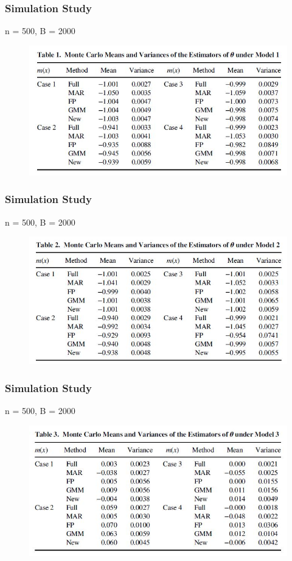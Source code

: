\documentclass{beamer}
\begin{document}
\begin{frame}
\frametitle{Simulation Study}
\centerline{n = 500, B = 2000}
\begin{figure}
\includegraphics[width=1\linewidth]{table1.jpg}
\end{figure}
\end{frame}
\begin{frame}
\frametitle{Simulation Study}
\centerline{n = 500, B = 2000}
\begin{figure}
\includegraphics[width=1\linewidth]{table2.jpg}
\end{figure}
\end{frame}
\begin{frame}
\frametitle{Simulation Study}
\centerline{n = 500, B = 2000}
\begin{figure}
\includegraphics[width=1\linewidth]{table3.jpg}
\end{figure}
\end{frame}
\end{document}
